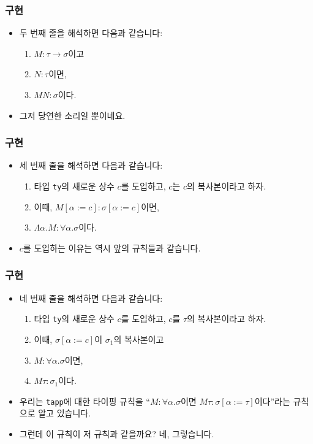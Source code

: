 \documentclass[slidestop,compress,mathserif]{beamer}
\begin{document}
    \begin{frame}
        \frametitle{구현}
        \begin{itemize}
            \item 두 번째 줄을 해석하면 다음과 같습니다:
            \begin{enumerate}
                \item $M : \tau \to \sigma$이고
                \item $N : \tau$이면,
                \item $M N : \sigma$이다.
            \end{enumerate}
            \item 그저 당연한 소리일 뿐이네요.
        \end{itemize}
    \end{frame}

    \begin{frame}
        \frametitle{구현}
        \begin{itemize}
            \item 세 번째 줄을 해석하면 다음과 같습니다:
            \begin{enumerate}
                \item 타입 \texttt{ty}의 새로운 상수 $c$를 도입하고, $c$는 $c$의 복사본이라고 하자.
                \item 이때, $M \left[ \alpha := c \right] : \sigma \left[ \alpha := c \right]$이면,
                \item $\Lambda \alpha . M : \forall \alpha . \sigma$이다.
            \end{enumerate}
            \item $c$를 도입하는 이유는 역시 앞의 규칙들과 같습니다.
        \end{itemize}
    \end{frame}

    \begin{frame}
        \frametitle{구현}
        \begin{itemize}
            \item 네 번째 줄을 해석하면 다음과 같습니다:
            \begin{enumerate}
                \item 타입 \texttt{ty}의 새로운 상수 $c$를 도입하고, $c$를 $\tau$의 복사본이라고 하자.
                \item 이때, $\sigma \left[ \alpha := c \right]$이 $\sigma_1$의 복사본이고
                \item $M : \forall \alpha . \sigma$이면,
                \item $M \tau : \sigma_1$이다. 
            \end{enumerate}
            \item 우리는 \texttt{tapp}에 대한 타이핑 규칙을 ``$M : \forall \alpha . \sigma$이면 $M \tau : \sigma \left[ \alpha := \tau \right]$이다''라는 규칙으로 알고 있습니다.
            \item 그런데 이 규칙이 저 규칙과 같을까요? 네, 그렇습니다.
        \end{itemize}
    \end{frame}
\end{document}
